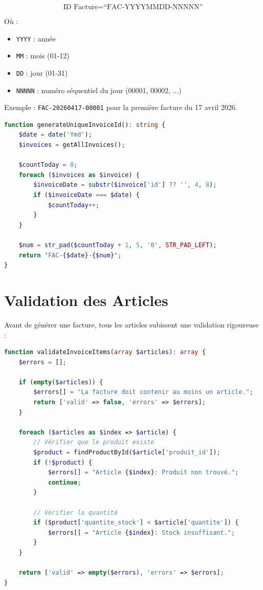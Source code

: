 \documentclass[12pt,a4paper]{report}
\begin{document}
\begin{equation}
\text{ID Facture} = \text{``FAC-YYYYMMDD-NNNNN''}
\end{equation}

Où :
\begin{itemize}
    \item \texttt{YYYY} : année
    \item \texttt{MM} : mois (01-12)
    \item \texttt{DD} : jour (01-31)
    \item \texttt{NNNNN} : numéro séquentiel du jour (00001, 00002, ...)
\end{itemize}

Exemple : \texttt{FAC-20260417-00001} pour la première facture du 17 avril 2026.

\begin{lstlisting}[language=PHP]
function generateUniqueInvoiceId(): string {
    $date = date('Ymd');
    $invoices = getAllInvoices();
    
    $countToday = 0;
    foreach ($invoices as $invoice) {
        $invoiceDate = substr($invoice['id'] ?? '', 4, 8);
        if ($invoiceDate === $date) {
            $countToday++;
        }
    }
    
    $num = str_pad($countToday + 1, 5, '0', STR_PAD_LEFT);
    return "FAC-{$date}-{$num}";
}
\end{lstlisting}

\section{Validation des Articles}

Avant de générer une facture, tous les articles subissent une validation rigoureuse :

\begin{lstlisting}[language=PHP]
function validateInvoiceItems(array $articles): array {
    $errors = [];
    
    if (empty($articles)) {
        $errors[] = "La facture doit contenir au moins un article.";
        return ['valid' => false, 'errors' => $errors];
    }
    
    foreach ($articles as $index => $article) {
        // Vérifier que le produit existe
        $product = findProductById($article['produit_id']);
        if (!$product) {
            $errors[] = "Article {$index}: Produit non trouvé.";
            continue;
        }
        
        // Vérifier la quantité
        if ($product['quantite_stock'] < $article['quantite']) {
            $errors[] = "Article {$index}: Stock insuffisant.";
        }
    }
    
    return ['valid' => empty($errors), 'errors' => $errors];
}
\end{lstlisting}
\end{document}
